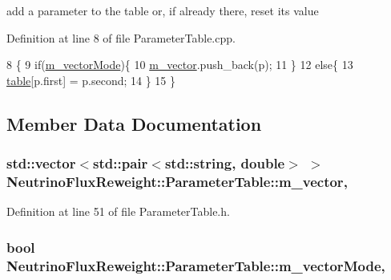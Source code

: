 add a parameter to the table or, if already there, reset its value 



Definition at line 8 of file Parameter\-Table.\-cpp.


\begin{DoxyCode}
8                                               \{
9     \textcolor{keywordflow}{if}(\hyperlink{class_neutrino_flux_reweight_1_1_parameter_table_aaaeca6d7d1d1db64e3078effdca83a9c}{m\_vectorMode})\{
10       \hyperlink{class_neutrino_flux_reweight_1_1_parameter_table_aea2a9552c84dae00ecdd95b6aa0a6f6c}{m\_vector}.push\_back(p);
11     \}
12     \textcolor{keywordflow}{else}\{
13       \hyperlink{class_neutrino_flux_reweight_1_1_parameter_table_a8568f2707a7541bc949d79d5961f429a}{table}[p.first] = p.second;
14     \}
15   \}
\end{DoxyCode}


\subsection{Member Data Documentation}
\hypertarget{class_neutrino_flux_reweight_1_1_parameter_table_aea2a9552c84dae00ecdd95b6aa0a6f6c}{
\subsubsection[{m\-\_\-vector}]{\setlength{\rightskip}{0pt plus 5cm}std\-::vector$<$std\-::pair$<$std\-::string, double$>$ $>$ Neutrino\-Flux\-Reweight\-::\-Parameter\-Table\-::m\-\_\-vector\hspace{0.3cm}{\ttfamily [mutable]}, {\ttfamily [protected]}}}\label{class_neutrino_flux_reweight_1_1_parameter_table_aea2a9552c84dae00ecdd95b6aa0a6f6c}


Definition at line 51 of file Parameter\-Table.\-h.

\hypertarget{class_neutrino_flux_reweight_1_1_parameter_table_aaaeca6d7d1d1db64e3078effdca83a9c}{
\subsubsection[{m\-\_\-vector\-Mode}]{\setlength{\rightskip}{0pt plus 5cm}bool Neutrino\-Flux\-Reweight\-::\-Parameter\-Table\-::m\-\_\-vector\-Mode\hspace{0.3cm}{\ttfamily [mutable]}, {\ttfamily [protected]}}}\label{class_neutrino_flux_reweight_1_1_parameter_table_aaaeca6d7d1d1db64e3078effdca83a9c}


